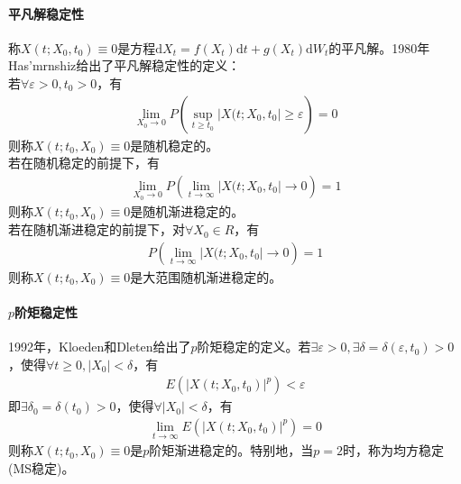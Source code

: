             \paragraph{平凡解稳定性}称$X(t;X_0,t_0) \equiv 0$是方程$\mathrm{d}X_t = f(X_t)\mathrm{d}t + g(X_t) \mathrm{d}W_t$的平凡解。1980年Has'mrnshiz给出了平凡解稳定性的定义：\\
            若$\forall \varepsilon >0,t_0>0$，有
            \begin{align*}
                \lim_{X_0\rightarrow 0}P\left(\sup_{t \geqslant t_0}|X(t;X_0,t_0| \geqslant \varepsilon \right) = 0
            \end{align*}
            则称$X(t;t_0,X_0)\equiv 0$是随机稳定的。\\
            若在随机稳定的前提下，有
            \begin{align*}
                \lim_{X_0\rightarrow 0}P\left(\lim_{t \rightarrow \infty}|X(t;X_0,t_0| \rightarrow 0 \right) = 1
            \end{align*}
            则称$X(t;t_0,X_0)\equiv 0$是随机渐进稳定的。\\
            若在随机渐进稳定的前提下，对$\forall X_0 \in R$，有
            \begin{align*}
                P\left(\lim_{t \rightarrow \infty}|X(t;X_0,t_0| \rightarrow 0 \right) = 1
            \end{align*}
            则称$X(t;t_0,X_0)\equiv 0$是大范围随机渐进稳定的。
            \paragraph{$p$阶矩稳定性}1992年，Kloeden和Dleten给出了$p$阶矩稳定的定义。若$\exists \varepsilon > 0,\exists \delta = \delta(\varepsilon,t_0)>0$，使得$\forall t \geqslant 0,|X_0|<\delta$，有
            \begin{align*}
            E\left( |X(t;X_0,t_0)|^p \right) < \varepsilon
            \end{align*}
            即$\exists \delta_0 = \delta(t_0)>0$，使得$\forall |X_0|<\delta$，有
            \begin{align*}
            \lim_{t\rightarrow \infty}E\left( |X(t;X_0,t_0)|^p \right) = 0
            \end{align*}
            则称$X(t;t_0,X_0) \equiv 0$是$p$阶矩渐进稳定的。特别地，当$p = 2$时，称为均方稳定(MS稳定)。
